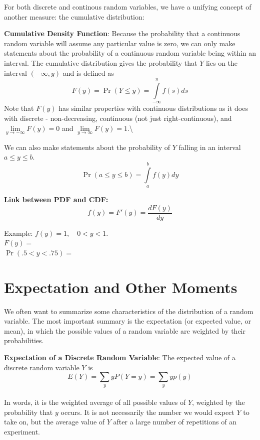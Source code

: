 \documentclass[]{book}
\theoremstyle{definition}
\theoremstyle{definition}
\theoremstyle{definition}
\theoremstyle{remark}
\begin{document}

For both discrete and continous random variables, we have a unifying
concept of another measure: the cumulative distribution:

\textbf{Cumulative Density Function}: Because the probability that a
continuous random variable will assume any particular value is zero, we
can only make statements about the probability of a continuous random
variable being within an interval. The cumulative distribution gives the
probability that \(Y\) lies on the interval \((-\infty,y)\) and is
defined as \[F(y)=\Pr(Y\le y)=\int\limits_{-\infty}^y f(s)ds\] Note that
\(F(y)\) has similar properties with continuous distributions as it does
with discrete - non-decreasing, continuous (not just right-continuous),
and \(\lim\limits_{y \to -\infty} F(y) = 0\) and
\(\lim\limits_{y \to \infty} F(y) = 1\).\textbackslash{}

We can also make statements about the probability of \(Y\) falling in an
interval \(a\le y\le b\). \[\Pr(a\le y\le b)=\int\limits_a^b f(y)dy\]

\textbf{Link between PDF and CDF:} \[f(y) = F'(y)=\frac{dF(y)}{dy}\]

\begin{framed}
\parbox[c]{4.25in}{Example: $f(y)=1, \quad 0<y<1$.\\ 
$F(y)=$\\
$\Pr(.5<y<.75)=$ }

\end{framed}

\section{Expectation and Other
Moments}\label{expectation-and-other-moments}

We often want to summarize some characteristics of the distribution of a
random variable. The most important summary is the expectation (or
expected value, or mean), in which the possible values of a random
variable are weighted by their probabilities.

\textbf{Expectation of a Discrete Random Variable}: The expected value
of a discrete random variable \(Y\) is
\[E(Y)=\sum\limits_{y} y P(Y=y)= \sum\limits_{y} y p(y)\]\\
In words, it is the weighted average of all possible values of \(Y\),
weighted by the probability that \(y\) occurs. It is not necessarily the
number we would expect \(Y\) to take on, but the average value of \(Y\)
after a large number of repetitions of an experiment.
\end{document}
